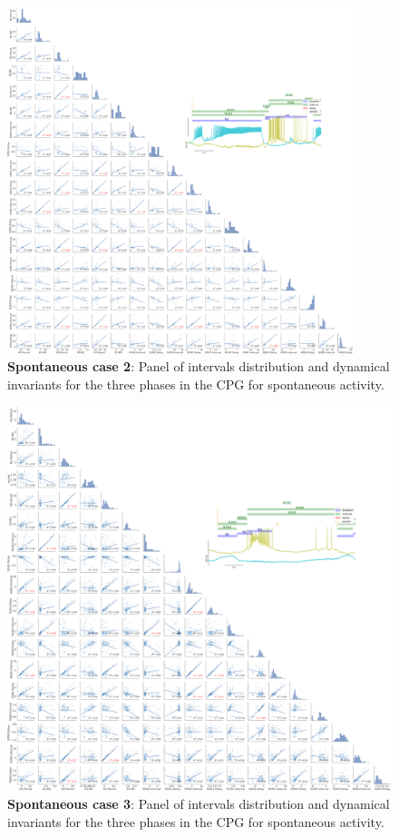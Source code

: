 \begin{figure}[htbp]
	\centering
	\includegraphics[width=0.9\textwidth]{./img/invariants/data/SUSSEX/prep3/images/3phases/panel_with_pairplot.png}
	\caption{\textbf{Spontaneous case 2}: Panel of intervals distribution and dynamical invariants for the three phases in the CPG for spontaneous activity.}
	\label{fig:prep3 invariants pairplot}
\end{figure}


\begin{figure}[htbp]
	\centering
	\includegraphics[width=\textwidth]{./img/invariants/data/SUSSEX/prep1/images/3phases/panel_with_pairplot.png}
	\caption{\textbf{Spontaneous case 3}: Panel of intervals distribution and dynamical invariants for the three phases in the CPG for spontaneous activity.}
	\label{fig:prep1 invariants pairplot}
\end{figure}

